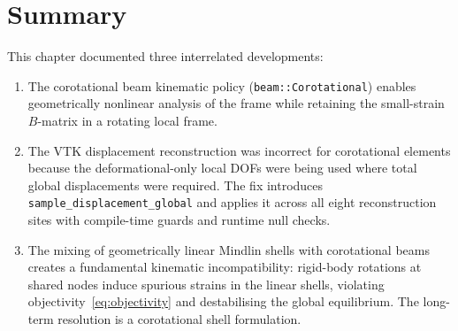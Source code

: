 \section{Summary}

This chapter documented three interrelated developments:
\begin{enumerate}
  \item The corotational beam kinematic policy
        (\texttt{beam::Corotational}) enables geometrically nonlinear
        analysis of the frame while retaining the small-strain
        $B$-matrix in a rotating local frame.

  \item The VTK displacement reconstruction was incorrect for
        corotational elements because the deformational-only local DOFs
        were being used where total global displacements were required.
        The fix introduces \texttt{sample\_displacement\_global} and
        applies it across all eight reconstruction sites with
        compile-time guards and runtime null checks.

  \item The mixing of geometrically linear Mindlin shells with
        corotational beams creates a fundamental kinematic
        incompatibility: rigid-body rotations at shared nodes induce
        spurious strains in the linear shells, violating
        objectivity~\eqref{eq:objectivity} and destabilising the global
        equilibrium.  The long-term resolution is a corotational shell
        formulation.
\end{enumerate}
